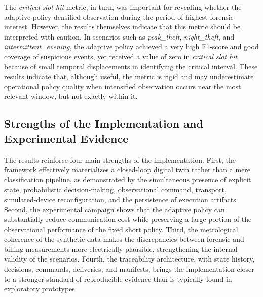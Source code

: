 \documentclass[journal]{IEEEtran}
\begin{document}
The \textit{critical slot hit} metric, in turn, was important for revealing whether the adaptive policy densified observation during the period of highest forensic interest. However, the results themselves indicate that this metric should be interpreted with caution. In scenarios such as \textit{peak\_theft}, \textit{night\_theft}, and \textit{intermittent\_evening}, the adaptive policy achieved a very high F1-score and good coverage of suspicious events, yet received a value of zero in \textit{critical slot hit} because of small temporal displacements in identifying the critical interval. These results indicate that, although useful, the metric is rigid and may underestimate operational policy quality when intensified observation occurs near the most relevant window, but not exactly within it.


\subsection{Strengths of the Implementation and Experimental Evidence}
The results reinforce four main strengths of the implementation. First, the framework effectively materializes a closed-loop digital twin rather than a mere classification pipeline, as demonstrated by the simultaneous presence of explicit state, probabilistic decision-making, observational command, transport, simulated-device reconfiguration, and the persistence of execution artifacts. Second, the experimental campaign shows that the adaptive policy can substantially reduce communication cost while preserving a large portion of the observational performance of the fixed short policy. Third, the metrological coherence of the synthetic data makes the discrepancies between forensic and billing measurements more electrically plausible, strengthening the internal validity of the scenarios. Fourth, the traceability architecture, with state history, decisions, commands, deliveries, and manifests, brings the implementation closer to a stronger standard of reproducible evidence than is typically found in exploratory prototypes.
\end{document}
